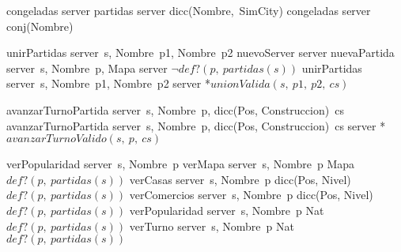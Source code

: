 \begin{tad}{}
    
\vspace{3mm}
    \tadObservadores
        \tadAlinearFunciones
            {congeladas}
            {server}
        \tadOperacion
            {partidas}
            {server}
            {dicc(Nombre,\ SimCity)}
            {}
        \tadOperacion
            {congeladas}
            {server}
            {conj(Nombre)}
            {}
            
\vspace{3mm}
    \tadGeneradores
    \tadAlinearFunciones
    {unirPartidas}
    {server\ s, Nombre\ p1, Nombre\ p2}
        \tadOperacion
            {nuevoServer}
            {}
            {server}
            {}
        \tadOperacion
            {nuevaPartida}
            {server\ s, Nombre\ p, Mapa}
            {server}
            {$\neg def?(p,\ partidas(s))$}
        \tadOperacion
            {unirPartidas}
            {server\ s, Nombre\ p1, Nombre\ p2}
            {server}
            {*$unionValida(s,\ p1,\ p2,\ cs)$}

    \tadAlinearFunciones
    {avanzarTurnoPartida}
    {server\ s, Nombre\ p, dicc(Pos, Construccion)\ cs}
        \tadOperacion
            {avanzarTurnoPartida}
            {server\ s, Nombre\ p, dicc(Pos, Construccion)\ cs}
            {server}
            {*$avanzarTurnoValido(s,\ p,\ cs)$} 
       
    \tadOtrasOperaciones
    \tadAlinearFunciones
    {verPopularidad}
    {server\ s, Nombre\ p}
        \tadOperacion
            {verMapa}
            {server\ s, Nombre\ p}
            {Mapa}
            {$def?(p,\ partidas(s))$}
        \tadOperacion
            {verCasas}
            {server\ s, Nombre\ p}
            {dicc(Pos, Nivel)}
            {$def?(p,\ partidas(s))$}        
        \tadOperacion
            {verComercios}
            {server\ s, Nombre\ p}
            {dicc(Pos, Nivel)}
            {$def?(p,\ partidas(s))$}
        \tadOperacion
            {verPopularidad}
            {server\ s, Nombre\ p}
            {Nat}
            {$def?(p,\ partidas(s))$}
        \tadOperacion
            {verTurno}
            {server\ s, Nombre\ p}
            {Nat}
            {$def?(p,\ partidas(s))$}


\end{tad}
